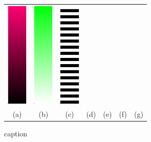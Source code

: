 \begin{figure}[htbp]
\begin{tabular}{ccccccc}
      \includegraphics[height=2in]{figures/colormaps/blackGradient.png}&
      \includegraphics[height=2in]{figures/colormaps/whiteGradient.png}&
      \includegraphics[height=2in]{figures/colormaps/zebra.png}\\
    (a)&(b)&(c)&(d)&(e)&(f)&(g)\\
    \end{tabular}
    
      
    \caption{caption}
    \label{fig:figures_colormaps_blackGradient}
\end{figure}



